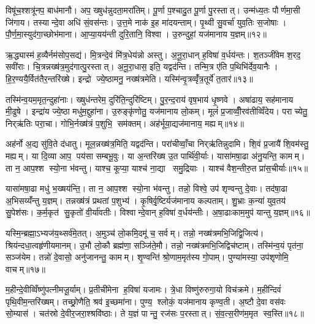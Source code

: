 विषू॑च॒श्शत्रू॑नप॒ बाध॑मानौ। अप॒ ख्षुध॑न्नुदता॒मरा॑तिम्। पू॒र्णा प॒श्चादु॒त पू॒र्णा पु॒रस्तात्। उन्म॑ध्य॒तः पौर्णमा॒सी जि॑गाय। तस्यान्दे॒वा अधि॑ सं॒वस॑न्तः। उ॒त्त॒मे नाक॑ इ॒ह मा॑दयन्ताम्। पृ॒थ्वी सु॒वर्चा॑ युव॒तिः स॒जोषाः। पौ॒र्ण॒मा॒स्युद॑गा॒च्छोभ॑माना। आ॒प्या॒यय॑न्ती दुरि॒तानि॒ विश्वा। उ॒रुन्दुहां॒ यज॑मानाय य॒ज्ञम्॥१२॥\anuvakamend[चि॒त्रभा॑नु॒र्यज॑माने दधातु ह॒विर्न॒ पाथ॒श्चेतो॑ जुषन्ता॒ञ्चेतो॑ मदेम॒ रोच॑माना॒मरा॑तीर्गो॒पौ य॒ज्ञम्]

ऋ॒द्ध्यास्म॑ ह॒व्यैर्नम॑सोप॒सद्य॑। मि॒त्रन्दे॒वं मि॑त्र॒धेय॑न्नो अस्तु। अ॒नू॒रा॒धान् ह॒विषा॑ व॒र्धय॑न्तः। श॒तञ्जी॑वेम श॒रद॒ सवी॑राः। चि॒त्रन्नख्ष॑त्र॒मुद॑गात्पु॒रस्तात्। अ॒नू॒रा॒धास॒ इति॒ यद्वद॑न्ति। तन्मि॒त्र ए॑ति प॒थिभि॑र्देव॒यानैः। हि॒र॒ण्ययै॒र्वित॑तैर॒न्तरि॑ख्षे। इन्द्रो ज्ये॒ष्ठामनु॒ नख्ष॑त्रमेति। यस्मि॑न्वृ॒त्रव्वृँ॑त्र॒तूर्ये॑ त॒तार॑॥१३॥

तस्मि॑न्व॒यम॒मृत॒न्दुहा॑नाः। ख्षुध॑न्तरेम॒ दुरि॑ति॒न्दुरि॑ष्टिम्। पु॒र॒न्द॒राय॑ वृष॒भाय॑ धृ॒ष्णवे। अषा॑ढाय॒ सह॑मानाय मी॒ढुषे। इन्द्रा॑य ज्ये॒ष्ठा मधु॑म॒द्दुहा॑ना। उ॒रुङ्कृ॑णोतु॒ यज॑मानाय लो॒कम्। मूलं॑ प्र॒जाव्वीँ॒रव॑तीव्विँदेय। पराच्येतु॒ निर्‌ऋ॑तिः परा॒चा। गोभि॒र्नख्ष॑त्रं प॒शुभि॒ सम॑क्तम्। अह॑र्भूया॒द्यज॑मानाय॒ मह्यम्॥१४॥

अह॑र्नो अ॒द्य सु॑वि॒ते द॑धातु। मूल॒न्नख्ष॑त्र॒मिति॒ यद्वद॑न्ति। परा॑चीव्वाँ॒चा निर्‌ऋ॑तिन्नुदामि। शि॒वं प्र॒जायै॑ शि॒वम॑स्तु॒ मह्यम्। या दि॒व्या आप॒ पय॑सा सम्बभू॒वुः। या अ॒न्तरि॑ख्ष उ॒त पार्थि॑वी॒र्याः। यासा॑मषा॒ढा अ॑नु॒यन्ति॒ कामम्। ता न॒ आप॒श्श स्यो॒ना भ॑वन्तु। याश्च॒ कूप्या॒ याश्च॑ ना॒द्या समु॒द्रियाः। याश्च॑ वैश॒न्तीरु॒त प्रा॑स॒चीर्याः॥१५॥

यासा॑मषा॒ढा मधु॑ भ॒ख्षय॑न्ति॒। ता न॒ आप॒श्श स्यो॒ना भ॑वन्तु। तन्नो॒ विश्वे॒ उप॑ शृण्वन्तु दे॒वाः। तद॑षा॒ढा अ॒भिसय्यँ॑न्तु य॒ज्ञम्। तन्नख्ष॑त्रं प्रथतां प॒शुभ्य॑। कृ॒षिर्वृ॒ष्टिर्यज॑मानाय कल्पताम्। शु॒भ्राः क॒न्या॑ युव॒तय॑ सु॒पेश॑सः। क॒र्म॒कृत॑ सु॒कृतो॑ वी॒र्या॑वतीः। विश्वान्दे॒वान् ह॒विषा॑ व॒र्धय॑न्तीः। अ॒षा॒ढाःकाम॒मुप॑ यान्तु य॒ज्ञम्॥१६॥

यस्मि॒न्ब्रह्मा॒ऽभ्यज॑य॒थ्सर्व॑मे॒तत्। अ॒मुञ्च॑ लो॒कमि॒दमू॑ च॒ सर्वम्। तन्नो॒ नख्ष॑त्रमभि॒जिद्वि॒जित्य॑। श्रिय॑न्दधा॒त्वहृ॑णीयमानम्। उ॒भौ लो॒कौ ब्रह्म॑णा॒ सञ्जि॑ते॒मौ। तन्नो॒ नख्ष॑त्रमभि॒जिद्विच॑ष्टाम्। तस्मि॑न्व॒यं पृत॑ना॒ सञ्ज॑येम। तन्नो॑ दे॒वासो॒ अनु॑जानन्तु॒ कामम्। शृ॒ण्वन्ति॑ श्रो॒णाम॒मृत॑स्य गो॒पाम्। पुण्या॑मस्या॒ उप॑शृणोमि॒ वाचम्॥१७॥

म॒हीन्दे॒वीव्विँष्णु॑पत्नीमजू॒र्याम्। प्र॒तीची॑मेना ह॒विषा॑ यजामः। त्रे॒धा विष्णु॑रुरुगा॒यो विच॑क्रमे। म॒हीन्दिवं॑ पृथि॒वीम॒न्तरि॑ख्षम्। तच्छ्रो॒णैति॒ श्रव॑ इ॒च्छमा॑ना। पुण्य॒ श्लोकं॒ यज॑मानाय कृण्व॒ती। अ॒ष्टौ दे॒वा वस॑वः सो॒म्यास॑। चत॑स्रो दे॒वीर॒जरा॒श्श्रवि॑ष्ठाः। ते य॒ज्ञं पान्तु॒ रज॑सः प॒रस्तात्। सं॒व॒त्स॒रीण॑म॒मृत स्व॒स्ति॥१८॥

